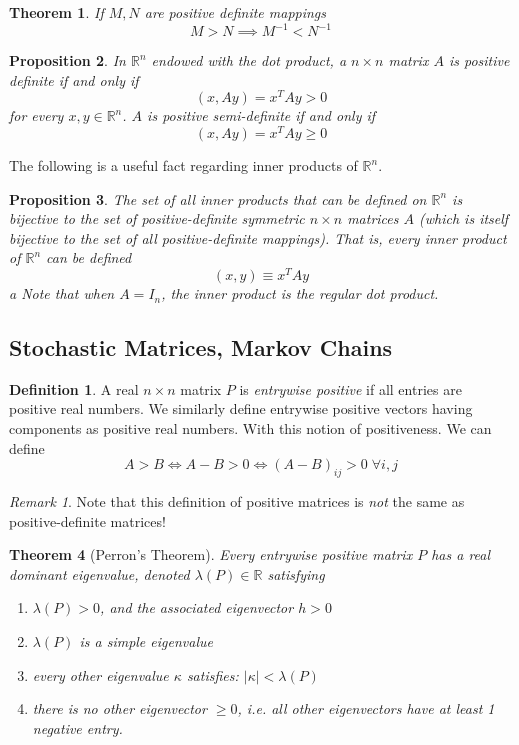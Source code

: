 \documentclass{article}
\newtheorem{theorem}{Theorem}[section]
\newtheorem{proposition}[theorem]{Proposition}
\theoremstyle{remark}
\newtheorem*{remark}{Remark}
\theoremstyle{definition}
\newtheorem{definition}{Definition}[section]
\begin{document}
    \begin{theorem}
    If $M, N$ are positive definite mappings 
    \[ M > N \implies M^{-1} < N^{-1}\]
    \end{theorem}

    \begin{proposition}
    In $\mathbb{R}^n$ endowed with the dot product, a $n \times n$ matrix $A$ is positive definite if and only if 
    \[(x, A y) = x^T A y > 0 \]
    for every $x, y \in \mathbb{R}^n$. $A$ is positive semi-definite if and only if 
    \[(x, A y) = x^T A y \geq 0\]
    \end{proposition}

    The following is a useful fact regarding inner products of $\mathbb{R}^n$. 
    \begin{proposition}
    The set of all inner products that can be defined on $\mathbb{R}^n$ is bijective to the set of positive-definite symmetric $n \times n$ matrices $A$ (which is itself bijective to the set of all positive-definite mappings). That is, every inner product of $\mathbb{R}^n$ can be defined 
    \[(x, y) \equiv x^T A y\]a
    Note that when $A = I_n$, the inner product is the regular dot product.
    \end{proposition}

  \subsection{Stochastic Matrices, Markov Chains}

    \begin{definition}
    A real $n \times n$ matrix $P$ is \textit{entrywise positive} if all entries are positive real numbers. We similarly define entrywise positive vectors having components as positive real numbers. With this notion of positiveness. We can define
    \[A > B \iff A - B > 0 \iff (A-B)_{i j} > 0 \; \forall i, j\]
    \end{definition}

    \begin{remark}
    Note that this definition of positive matrices is \textit{not} the same as positive-definite matrices! 
    \end{remark}

    \begin{theorem}[Perron's Theorem]
    Every entrywise positive matrix $P$ has a real \textit{dominant eigenvalue}, denoted $\lambda(P) \in \mathbb{R}$ satisfying
    \begin{enumerate}
        \item $\lambda(P) > 0$, and the associated eigenvector $h >0$
        \item $\lambda(P)$ is a simple eigenvalue
        \item every other eigenvalue $\kappa$ satisfies: $|\kappa| < \lambda(P)$
        \item there is no other eigenvector $\geq 0$, i.e. all other eigenvectors have at least 1 negative entry.
    \end{enumerate}
    \end{theorem}
\end{document}
